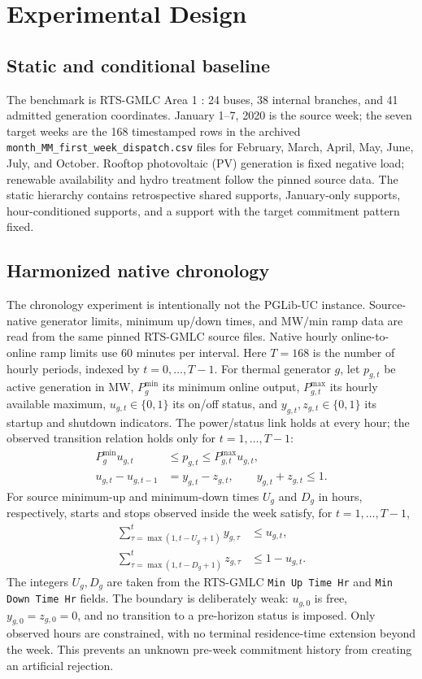 \documentclass[journal]{IEEEtran}
\begin{document}
\section{Experimental Design}
\subsection{Static and conditional baseline}
The benchmark is RTS-GMLC Area 1 \cite{Barrows2020,RTSGMLCRepo}: 24 buses, 38 internal branches, and 41 admitted generation coordinates. January 1--7, 2020 is the source week; the seven target weeks are the 168 timestamped rows in the archived \texttt{month\_MM\_first\_week\_dispatch.csv} files for February, March, April, May, June, July, and October. Rooftop photovoltaic (PV) generation is fixed negative load; renewable availability and hydro treatment follow the pinned source data. The static hierarchy contains retrospective shared supports, January-only supports, hour-conditioned supports, and a support with the target commitment pattern fixed.

\subsection{Harmonized native chronology}
The chronology experiment is intentionally not the PGLib-UC instance. Source-native generator limits, minimum up/down times, and $\mathrm{MW/min}$ ramp data are read from the same pinned RTS-GMLC source files. Native hourly online-to-online ramp limits use 60 minutes per interval. Here $T=168$ is the number of hourly periods, indexed by $t=0,\ldots,T-1$. For thermal generator $g$, let $p_{g,t}$ be active generation in MW, $P_g^{\min}$ its minimum online output, $P_{g,t}^{\max}$ its hourly available maximum, $u_{g,t}\in\{0,1\}$ its on/off status, and $y_{g,t},z_{g,t}\in\{0,1\}$ its startup and shutdown indicators. The power/status link holds at every hour; the observed transition relation holds only for $t=1,\ldots,T-1$:
\begin{align}
P_g^{\min}u_{g,t}&\le p_{g,t}\le P_{g,t}^{\max}u_{g,t},\label{eq:pulink}\\
u_{g,t}-u_{g,t-1}&=y_{g,t}-z_{g,t},\qquad y_{g,t}+z_{g,t}\le1.\label{eq:transition}
\end{align}
For source minimum-up and minimum-down times $U_g$ and $D_g$ in hours, respectively, starts and stops observed inside the week satisfy, for $t=1,\ldots,T-1$,
\begin{align}
\sum_{\tau=\max(1,t-U_g+1)}^{t}y_{g,\tau}&\le u_{g,t},\label{eq:minup}\\
\sum_{\tau=\max(1,t-D_g+1)}^{t}z_{g,\tau}&\le1-u_{g,t}.\label{eq:mindown}
\end{align}
The integers $U_g,D_g$ are taken from the RTS-GMLC \texttt{Min Up Time Hr} and \texttt{Min Down Time Hr} fields. The boundary is deliberately weak: $u_{g,0}$ is free, $y_{g,0}=z_{g,0}=0$, and no transition to a pre-horizon status is imposed. Only observed hours are constrained, with no terminal residence-time extension beyond the week. This prevents an unknown pre-week commitment history from creating an artificial rejection.
\end{document}
